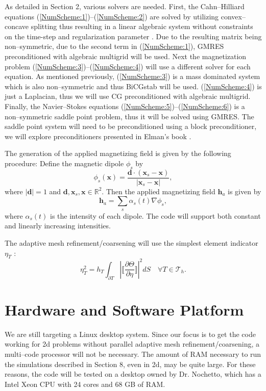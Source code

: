 \documentclass[11pt,fullpage]{article}
\newcommand{\Tau}{\mathcal{T}}
\newcommand{\Real}{\mathbb R}
\newcommand{\abs}[1]{\left\vert#1\right\vert}
\newcommand{\grad}{\nabla}
\theoremstyle{lemma}
\theoremstyle{definition}
\theoremstyle{lemma}
\begin{document}
As detailed in Section 2, various solvers are needed. First, the Cahn--Hilliard equations (\ref{NumScheme:1})--(\ref{NumScheme:2}) are solved by utilizing convex--concave splitting thus resulting in a linear algebraic system without constraints on the time-step and regularization parameter \cite{CahnHilliard}. Due to the resulting matrix being non--symmetric, due to the second term in (\ref{NumScheme:1}), GMRES preconditioned with algebraic multigrid will be used. Next the magnetization problem (\ref{NumScheme:3})--(\ref{NumScheme:4}) will use a different solver for each equation. As mentioned previously, (\ref{NumScheme:3}) is a mass dominated system which is also non--symmetric and thus BiCGstab will be used. (\ref{NumScheme:4}) is just a Laplacian, thus we will use CG preconditioned with algebraic multigrid. Finally, the Navier--Stokes equations (\ref{NumScheme:5})--(\ref{NumScheme:6}) is a non--symmetric saddle point problem, thus it will be solved using GMRES. The saddle point system will need to be preconditioned using a block preconditioner, we will explore preconditioners presented in Elman's book \cite{Precond}.

The generation of the applied magnetizing field is given by the following procedure: Define the magnetic dipole $\phi_s$ by
$$
\phi_s(\mathbf{x}) = \frac{\mathbf{d}\cdot(\mathbf{x}_s - \mathbf{x})}{\abs{\mathbf{x}_s - \mathbf{x}}}, 
$$
where $\abs{\mathbf{d}}=1$ and $\mathbf{d},\mathbf{x}_s,\mathbf{x}\in\Real^2$. Then the applied magnetizing field $\mathbf{h}_a$ is given by
\begin{equation}\label{AMF}
\mathbf{h}_a = \sum_s \alpha_s(t) \grad\phi_s,
\end{equation}
where $\alpha_s(t)$ is the intensity of each dipole. The code will support both constant and linearly increasing intensities.

The adaptive mesh refinement/coarsening will use the simplest element indicator $\eta_T$ \cite{ErrorInd}:
\begin{equation}\label{ErrorInd}
	\eta_T^2 = h_T\int_{\partial T}\abs{\bigg\llbracket\frac{\partial \Theta}{\partial \eta}\bigg\rrbracket}^2dS \quad \forall T\in\Tau_h.
\end{equation}


\section{Hardware and Software Platform}
We are still targeting a Linux desktop system. Since our focus is to get the code working for 2d problems without parallel adaptive mesh refinement/coarsening, a multi--code processor will not be necessary. The amount of RAM necessary to run the simulations described in Section 8, even in 2d, may be quite large. For these reasons, the code will be tested on a desktop owned by Dr. Nochetto, which has a Intel Xeon CPU with 24 cores and 68 GB of RAM.
\end{document}

